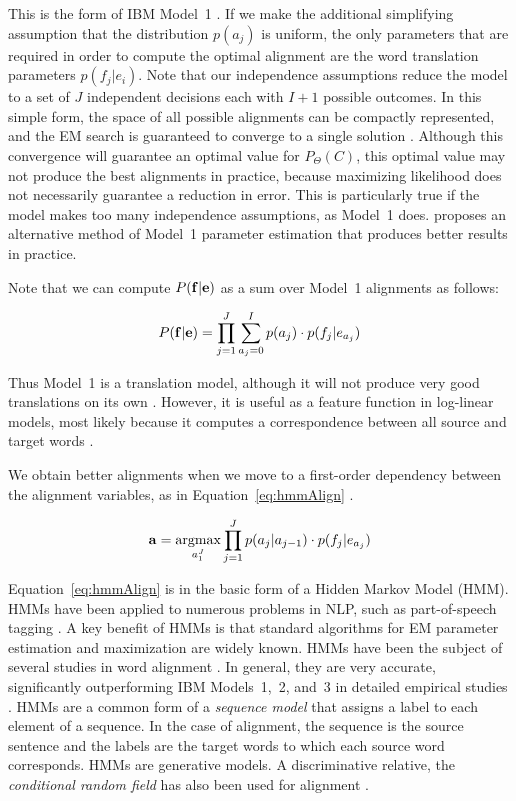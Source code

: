 \noindent This is the form of IBM Model~1 
\citep{Brown:1993:cl}.  If we make the
additional simplifying assumption that 
the distribution $p(a_j)$ is uniform,
the only parameters that are required 
in order to compute the optimal alignment
are the word translation parameters $p(f_j|e_i)$.
Note that our independence 
assumptions reduce the model to a set of
$J$ independent decisions each with $I+1$ possible 
outcomes.  In this simple form, the space of 
all possible alignments can be compactly represented, 
and the EM search is guaranteed to converge
to a single solution \citep{Brown:1993:cl}.  
Although this convergence will guarantee an
optimal value for $P_\Theta(C)$, this optimal
value may not produce the best alignments in
practice, because maximizing likelihood does
not necessarily guarantee a reduction in error.
This is particularly true if the model makes
too many independence assumptions, as Model~1 does.
\citet{Moore:2004:acl} proposes an alternative
method of Model~1 parameter estimation that
produces better results in practice.

Note that we can compute $P({\bf f}|{\bf e})$ as a sum over 
Model~1 alignments as follows:

\begin{equation}
P({\bf f}|{\bf e}) = \prod_{j=1}^J \sum_{a_j=0}^I p(a_j) \cdot p(f_j|e_{a_j})
\end{equation}

\noindent Thus Model~1 is a translation model,
although it will not produce very good translations
on its own \citep{Knight:1999:cl}.  However, it is useful as
a feature function in log-linear models, most likely because
it computes a correspondence between all source and 
target words \citep{Och:2004:naacl,Lopez:2006:amta}.

We obtain better alignments
when we move to a first-order dependency between
the alignment variables, 
as in Equation~\ref{eq:hmmAlign} 
\citep{Vogel:1996:coling}.

\begin{equation}\label{eq:hmmAlign}
\mathbf{a} =  \argmax_{a_1^J} \prod_{j=1}^J p(a_j|a_{j-1}) \cdot p(f_j|e_{a_j})
\end{equation}

\noindent Equation~\ref{eq:hmmAlign} is in the 
basic form of a Hidden Markov Model (HMM).  
HMMs have been applied to numerous problems in 
NLP, such as part-of-speech tagging \citep{merialdo:1994:cl}.
A key benefit of HMMs is that 
standard algorithms for EM parameter estimation \citep{Baum:1972} 
and maximization \citep{Viterbi:1967:ieeetit} are widely
known.  HMMs have been the subject of several studies
in word alignment 
\citep{Och:2000:coling,Toutanova:2002:emnlp,Lopez:2005:wpt,DeNero:2007:acl}.
In general, they are very accurate, significantly
outperforming IBM Models~1,~2, and~3 in 
detailed empirical studies 
\citep{Och:2000:coling,Och:2003:cl}.  HMMs are 
a common form of a {\em sequence model} that
assigns a label to each element of a sequence.
In the case of alignment, the sequence is the
source sentence and the labels are the target
words to which each source word corresponds.
HMMs are generative models.  A discriminative
relative, the {\em conditional random field}
has also been used for alignment \citep{Blunsom:2006:acl-coling}.

